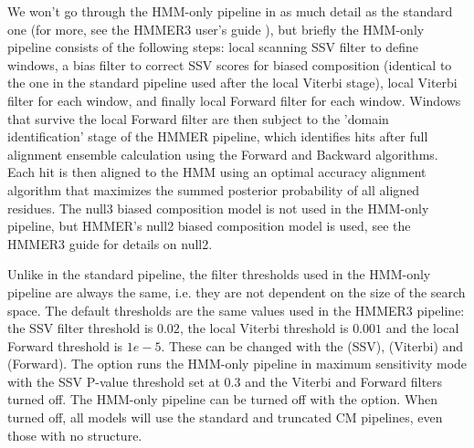 We won't go through the HMM-only pipeline in as much detail as the
standard one (for more, see the HMMER3 user's guide
\citep{hmmer3guide}), but briefly the HMM-only pipeline consists of
the following steps: local scanning SSV filter to define windows, a
bias filter to correct SSV scores for biased composition (identical to
the one in the standard pipeline used after the local Viterbi stage),
local Viterbi filter for each window, and finally local Forward filter
for each window. Windows that survive the local Forward filter are
then subject to the 'domain identification' stage of the HMMER
pipeline, which identifies hits after full alignment ensemble
calculation using the Forward and Backward algorithms. Each hit is
then aligned to the HMM using an optimal accuracy alignment algorithm
that maximizes the summed posterior probability of all aligned
residues. The null3 biased composition model is not used in the
HMM-only pipeline, but HMMER's null2 biased composition model is used, 
see the HMMER3 guide for details on null2.

Unlike in the standard pipeline, the filter thresholds used in the
HMM-only pipeline are always the same, i.e. they are not dependent on
the size of the search space. The default thresholds are the same
values used in the HMMER3 pipeline: the SSV filter threshold is
$0.02$, the local Viterbi threshold is $0.001$ and the local Forward
threshold is $1e-5$. These can be changed with the 
(SSV),  (Viterbi) and  (Forward). The
 option runs the HMM-only pipeline in maximum
sensitivity mode with the SSV P-value threshold set at 0.3 and the
Viterbi and Forward filters turned off. The HMM-only pipeline can be
turned off with the  option. When turned off, all
models will use the standard and truncated CM pipelines, even those
with no structure.
